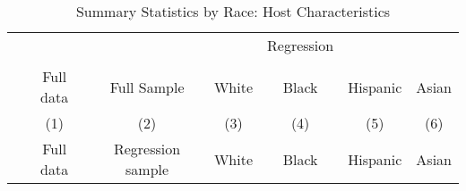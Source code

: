 {
	\def\sym#1{\ifmmode^{#1}\else\(^{#1}\)\fi}
	\begin{longtable}{l*{6}{c}}
		\caption{Summary Statistics by Race: Host Characteristics}\\
		
		\hline
		&\multicolumn{1}{c}{}&\multicolumn{1}{c}{}&\multicolumn{1}{c}{}&\multicolumn{1}{c}{Regression}&\multicolumn{1}{c}{}&\multicolumn{1}{c}{}\\
		\cline{3-7}\\
			&\multicolumn{1}{c}{Full data}&\multicolumn{1}{c}{Full Sample}&\multicolumn{1}{c}{White}&\multicolumn{1}{c}{Black}&\multicolumn{1}{c}{Hispanic}&\multicolumn{1}{c}{Asian}\\
		
		\hline\hline\endfirsthead\hline\endhead\hline\endfoot\endlastfoot
		&\multicolumn{1}{c}{(1)}&\multicolumn{1}{c}{(2)}&\multicolumn{1}{c}{(3)}&\multicolumn{1}{c}{(4)}&\multicolumn{1}{c}{(5)}&\multicolumn{1}{c}{(6)}\\
		&\multicolumn{1}{c}{Full data}&\multicolumn{1}{c}{Regression sample}&\multicolumn{1}{c}{White}&\multicolumn{1}{c}{Black}&\multicolumn{1}{c}{Hispanic}&\multicolumn{1}{c}{Asian}\\
		\hline
		\endhead             
		     

\end{longtable}}
